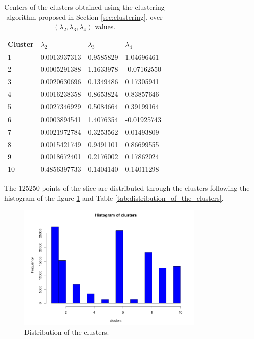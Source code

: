 \begin{table}[H]
\begin{center}
    \begin{tabular}{|l|l|l|l|}
    \hline
    \textbf{Cluster} & $\lambda_{2}$ & $\lambda_{3}$ & $\lambda_{4}$         \\ \hline
    1     & 0.0013937313 & 0.9585829 & 1.04696461              \\ \hline
    2     & 0.0005291388 & 1.1633978 & -0.07162550            \\ \hline
    3     & 0.0020630696 & 0.1349486 & 0.17305941            \\ \hline
    4     &  0.0016238358 & 0.8653824 & 0.83857646               \\ \hline
    5     & 0.0027346929 & 0.5084664 & 0.39199164                \\ \hline
    6     & 0.0003894541 & 1.4076354 & -0.01925743               \\ \hline
    7     & 0.0021972784 & 0.3253562 & 0.01493809                 \\ \hline
    8     & 0.0015421749 & 0.9491101 & 0.86699555                \\ \hline
    9     & 0.0018672401 & 0.2176002 & 0.17862024            \\ \hline
    10   & 0.4856397733 & 0.1404140 & 0.14011298             \\ \hline
    \end{tabular}
    \caption {Centers of the clusters obtained using the clustering algorithm proposed in Section \ref{sec:clustering}, over $(\lambda_{2}, \lambda_{3}, \lambda_{4})$ values.}
    \label{tab:center_of_the_clusters}
    \end{center}
\end{table}

The 125250 points of the slice are distributed through the clusters following the histogram of the figure \ref{fig:Clusters_histogram} and Table \ref{tab:distribution_of_the_clusters}. 

\begin{figure}[H]
    \centering
    \includegraphics[width=0.8\textwidth]{images/Clusters_histogram.png}
    \caption{Distribution of the clusters.}
    \label{fig:Clusters_histogram}
\end{figure}

